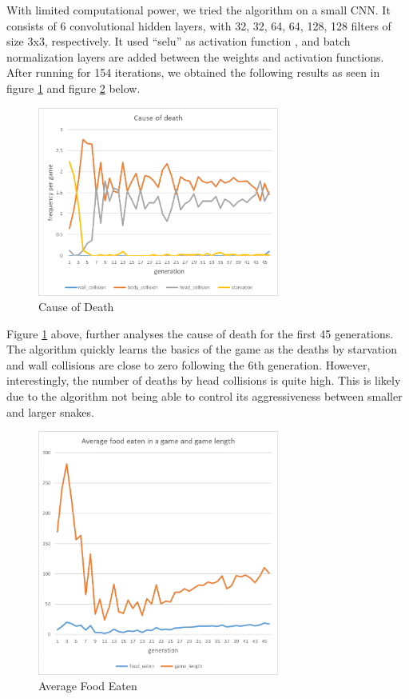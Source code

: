 \documentclass{article}
\begin{document}
With limited computational power, we tried the algorithm on a small CNN. It
consists of 6 convolutional hidden layers, with 32, 32, 64, 64, 128, 128 filters
of size 3x3, respectively. It used “selu” as activation function
\cite{SeluPaper}, and batch normalization layers are added between the weights
and activation functions. After running for 154 iterations, we obtained the
following results as seen in figure \ref{fig:cause_of_death} and figure
\ref{fig:average_food_eaten} below.

\begin{figure}[!ht]
  \centering
  \includegraphics[width=300px]{cause_of_death}
  \caption{Cause of Death}
  \label{fig:cause_of_death}
\end{figure}

\FloatBarrier

Figure \ref{fig:cause_of_death} above, further analyses the cause of death for
the first 45 generations. The algorithm quickly learns the basics of the game as
the deaths by starvation and wall collisions are close to zero following the 6th
generation.  However, interestingly, the number of deaths by head collisions is
quite high.  This is likely due to the algorithm not being able to control its
aggressiveness between smaller and larger snakes.

\begin{figure}[!ht]
  \centering
  \includegraphics[width=300px]{average_food_eaten}
  \caption{Average Food Eaten}
  \label{fig:average_food_eaten}
\end{figure}
\end{document}
